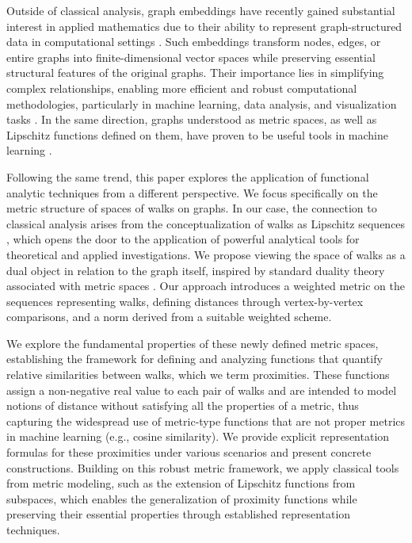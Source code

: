 \documentclass[preprint,12pt]{elsarticle}
\begin{document}
Outside of classical analysis, graph embeddings have recently gained substantial interest in applied mathematics due to their ability to represent graph-structured data in computational settings \cite{cai,maka}. Such embeddings transform nodes, edges, or entire graphs into finite-dimensional vector spaces while preserving essential structural features of the original graphs. Their importance lies in simplifying complex relationships, enabling more efficient and robust computational methodologies, particularly in machine learning, data analysis, and visualization tasks \cite{dasg,hjal,pileh}. 
In the same direction, graphs understood as metric spaces, as well as Lipschitz functions defined on them, have proven to be useful tools in machine learning \cite{cal,cha,falsan,kyng}.

Following the same trend, this paper explores the application of functional analytic techniques from a different perspective. We focus specifically on the metric structure of spaces of walks on graphs. In our case, the connection to classical analysis arises from the conceptualization of walks as Lipschitz sequences \cite{goy}, which opens the door to the application of powerful analytical tools for theoretical and applied investigations. We propose viewing the space of walks as a dual object in relation to the graph itself, inspired by standard duality theory associated with metric spaces \cite{A.E56}. Our approach introduces a weighted metric on the sequences representing walks, defining distances through vertex-by-vertex comparisons, and a norm derived from a suitable weighted scheme.


We explore the fundamental properties of these newly defined metric spaces, establishing the framework for defining and analyzing functions that quantify relative similarities between walks, which we term proximities. These functions assign a non-negative real value to each pair of walks and are intended to model notions of distance without satisfying all the properties of a metric, thus capturing the widespread use of metric-type functions that are not proper metrics in machine learning (e.g., cosine similarity). We provide explicit representation formulas for these proximities under various scenarios and present concrete constructions. Building on this robust metric framework, we apply classical tools from metric modeling, such as the extension of Lipschitz functions from subspaces, which enables the generalization of proximity functions while preserving their essential properties through established representation techniques.
\end{document}
